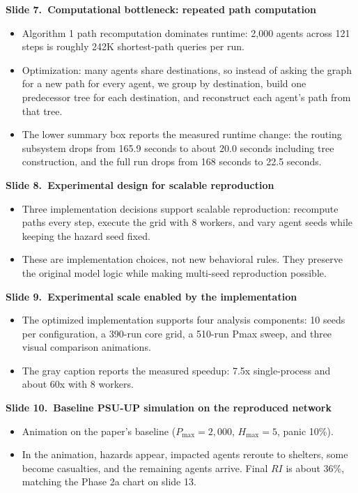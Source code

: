 \documentclass[11pt]{article}
\newcommand{\slide}[2]{\vspace{0.6em}\noindent\textbf{Slide #1.\ #2}\par\nopagebreak\vspace{0.1em}}
\begin{document}
\slide{7}{Computational bottleneck: repeated path computation}
\begin{itemize}
\item Algorithm 1 path recomputation dominates runtime: 2{,}000 agents across 121 steps is roughly 242K shortest-path queries per run.
\item Optimization: many agents share destinations, so instead of asking the graph for a new path for every agent, we group by destination, build one predecessor tree for each destination, and reconstruct each agent's path from that tree.
\item The lower summary box reports the measured runtime change: the routing subsystem drops from 165.9 seconds to about 20.0 seconds including tree construction, and the full run drops from 168 seconds to 22.5 seconds.
\end{itemize}

\slide{8}{Experimental design for scalable reproduction}
\begin{itemize}
\item Three implementation decisions support scalable reproduction: recompute paths every step, execute the grid with 8 workers, and vary agent seeds while keeping the hazard seed fixed.
\item These are implementation choices, not new behavioral rules. They preserve the original model logic while making multi-seed reproduction possible.
\end{itemize}

\slide{9}{Experimental scale enabled by the implementation}
\begin{itemize}
\item The optimized implementation supports four analysis components: 10 seeds per configuration, a 390-run core grid, a 510-run Pmax sweep, and three visual comparison animations.
\item The gray caption reports the measured speedup: 7.5x single-process and about 60x with 8 workers.
\end{itemize}

\slide{10}{Baseline PSU-UP simulation on the reproduced network}
\begin{itemize}
\item Animation on the paper's baseline ($P_{\max}=2{,}000$, $H_{\max}=5$, panic 10\%).
\item In the animation, hazards appear, impacted agents reroute to shelters, some become casualties, and the remaining agents arrive. Final $RI$ is about 36\%, matching the Phase 2a chart on slide 13.
\end{itemize}
\end{document}
